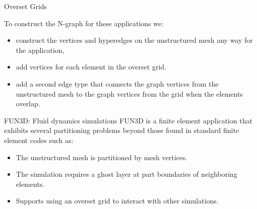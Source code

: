 \documentclass{beamer}
\begin{document}
\begin{textblock}{15.6}
\begin{textblock}{5}
\begin{block}{Overset Grids}
            
            To construct the N-graph for these applications we:
            \begin{itemize}
            \item construct the vertices and hyperedges on the unstructured mesh any way for the application,
            \item add vertices for each element in the overset grid.
            \item add a second edge type that connects the graph vertices from the unstructured mesh to the graph vertices from the grid when the elements overlap.
            \end{itemize}

            
          \end{block}
          
          \begin{block}{FUN3D: Fluid dynamics simulations}
            FUN3D is a finite element application that exhibits several partitioning problems beyond those found in standard finite element codes such as:
            \begin{itemize}
            \item The unstructured mesh is partitioned by mesh vertices.
            \item The simulation requires a ghost layer at part boundaries of neighboring elements.
            \item Supports using an overset grid to interact with other simulations.
            \end{itemize}



            
          \end{block}
        \end{textblock}
      \end{textblock}
\end{document}

